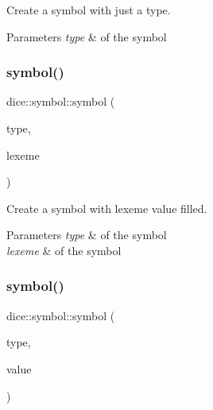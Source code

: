 Create a symbol with just a type. 


\begin{DoxyParams}{Parameters}
{\em type} & of the symbol \\
\hline
\end{DoxyParams}
\mbox{\label{structdice_1_1symbol_a5554a3a825bb97c3961b069963af63d8}} 
\subsubsection{\texorpdfstring{symbol()}{symbol()}\hspace{0.1cm}{\footnotesize\ttfamily [2/3]}}
{\footnotesize\ttfamily dice\+::symbol\+::symbol (\begin{DoxyParamCaption}\item[{\mbox{\hyperlink{symbols_8hpp_ab0295a855bb7eadc138abd6993af3aea}{symbol\+\_\+type}}}]{type,  }\item[{std\+::string}]{lexeme }\end{DoxyParamCaption})\hspace{0.3cm}{\ttfamily [inline]}}



Create a symbol with lexeme value filled. 


\begin{DoxyParams}{Parameters}
{\em type} & of the symbol \\
\hline
{\em lexeme} & of the symbol \\
\hline
\end{DoxyParams}
\mbox{\label{structdice_1_1symbol_a30caf2c6b632e0a35f584fcac22d0c0c}} 
\subsubsection{\texorpdfstring{symbol()}{symbol()}\hspace{0.1cm}{\footnotesize\ttfamily [3/3]}}
{\footnotesize\ttfamily dice\+::symbol\+::symbol (\begin{DoxyParamCaption}\item[{\mbox{\hyperlink{symbols_8hpp_ab0295a855bb7eadc138abd6993af3aea}{symbol\+\_\+type}}}]{type,  }\item[{std\+::unique\+\_\+ptr$<$ \mbox{\hyperlink{classdice_1_1base__value}{base\+\_\+value}} $>$}]{value }\end{DoxyParamCaption})\hspace{0.3cm}{\ttfamily [inline]}}



